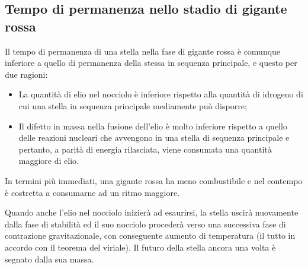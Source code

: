 \subsection{Tempo di permanenza nello stadio di gigante rossa}
Il tempo di permanenza di una stella nella fase di gigante rossa è comunque inferiore a quello di permanenza della stessa in sequenza principale, e questo  per due ragioni:
\begin{itemize}
\item
La quantit\`{a} di elio nel nocciolo è inferiore rispetto alla quantit\`{a} di idrogeno di cui una stella in sequenza principale mediamente può disporre;
\item
Il difetto in massa nella fusione dell'elio è molto inferiore rispetto a quello delle reazioni nucleari che avvengono in una stella di sequenza principale e pertanto, a parit\`{a} di energia rilasciata, viene consumata una quantit\`{a} maggiore di elio.
\end{itemize}
In termini più immediati, una gigante rossa ha meno combustibile e nel contempo è costretta a consumarne ad un ritmo maggiore.
\par
Quando anche l'elio nel nocciolo inizier\`{a} ad esaurirsi, la stella uscir\`{a} nuovamente dalla fase di stabilit\`{a} ed il suo nocciolo proceder\`{a} verso una successiva fase di contrazione gravitazionale, con conseguente aumento di temperatura (il tutto in accordo con il teorema del viriale).
Il futuro della stella ancora una volta è segnato dalla sua massa.
